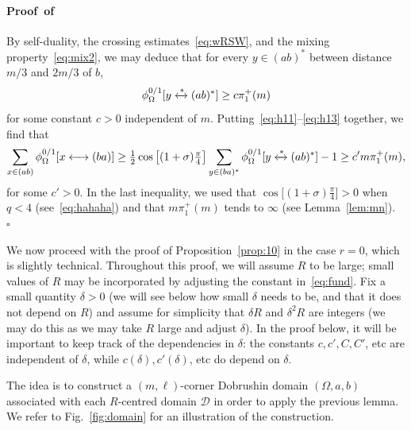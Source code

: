\documentclass[a4paper,oneside,11pt]{article}
\numberwithin{equation}{section}
\numberwithin{equation}{section}
\numberwithin{equation}{section}
\newenvironment{proof}[1][\relax]%
  {\paragraph{Proof\ifx#1\relax\else~of #1\fi}}%
  {~\hfill$\square$\par\bigskip}
\newcommand{\calD}{\mathcal{D}}
\begin{document}
\begin{proof}
    By self-duality, the crossing estimates~\eqref{eq:wRSW}, and the mixing property~\eqref{eq:mix2}, we may deduce that for every $y\in(ab)^*$ between distance $m/3$ and $2m/3$ of $b$, 
    \begin{equation}\label{eq:h13}
    \phi_\Omega^{0/1}[y\xleftrightarrow{*}    (ab)^*]\ge c\pi_1^+(m)
    \end{equation}
	for some constant $c>0$ independent of $m$.  
	Putting~\eqref{eq:h11}--\eqref{eq:h13} together, we find that 
    \begin{align*}
    	\sum_{x\in(ab)}\phi_\Omega^{0/1}[x\longleftrightarrow (ba)] 
	 	\geq \tfrac12 \cos \big[(1+\sigma)\tfrac{\pi}{4}\big] \sum_{y\in(ba)^*}\phi_\Omega^{0/1}[y\xleftrightarrow{*}    (ab)^*] - 1
		\geq c' m\pi_1^+(m),
	\end{align*}
	for some $c' > 0$. In the last inequality, we used that $\cos \big[(1+\sigma)\tfrac{\pi}{4}\big]>0$ when $q < 4$ (see~\eqref{eq:hahaha}) and that 
	$m\pi_1^+(m)$ tends to $\infty$ (see Lemma~\ref{lem:mn}).
\end{proof}

We now proceed with the proof of Proposition~\ref{prop:10} in the case $r = 0$, which is slightly technical. Throughout this proof, we will assume $R$ to be large; small values of $R$ may be incorporated by adjusting the constant in~\eqref{eq:fund}.  Fix a small quantity $\delta > 0$ (we will see below how small $\delta$ needs to be, and that it does not depend on $R$) and assume for simplicity that $\delta R$ and $\delta^2 R$ are integers (we may do this as we may take $R$ large and adjust $\delta$). In the proof below, it will be important to keep track of the dependencies in $\delta$: the constants $c,c',C,C'$, etc are independent of $\delta$, while $c(\delta), c'(\delta)$, etc do depend on $\delta$.


The idea is to construct a $(m,\ell)$-corner Dobrushin domain $(\Omega,a,b)$ associated with each $R$-centred domain $\calD$ in order to apply the previous lemma. We refer to Fig.~\ref{fig:domain} for an illustration of the construction. 
\end{document}
